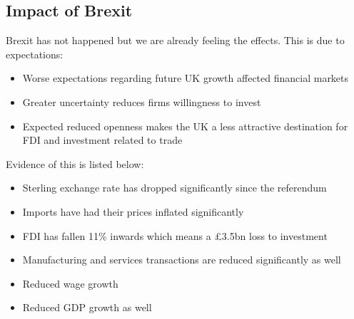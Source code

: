 \documentclass[12pt, letterpaper]{article}
\begin{document}
\subsection{Impact of Brexit}
Brexit has not happened but we are already feeling the effects. This is due to expectations:
\begin{itemize}
	\item Worse expectations regarding future UK growth affected financial markets
	\item Greater uncertainty reduces firms willingness to invest
	\item Expected reduced openness makes the UK a less attractive destination for FDI and investment related to trade
\end{itemize}
Evidence of this is listed below:
\begin{itemize}
	\item Sterling exchange rate has dropped significantly since the referendum
	\item Imports have had their prices inflated significantly
	\item FDI has fallen 11\% inwards which means a £3.5bn loss to investment
	\item Manufacturing and services transactions are reduced significantly as well
	\item Reduced wage growth
	\item Reduced GDP growth as well
\end{itemize}
\end{document}
